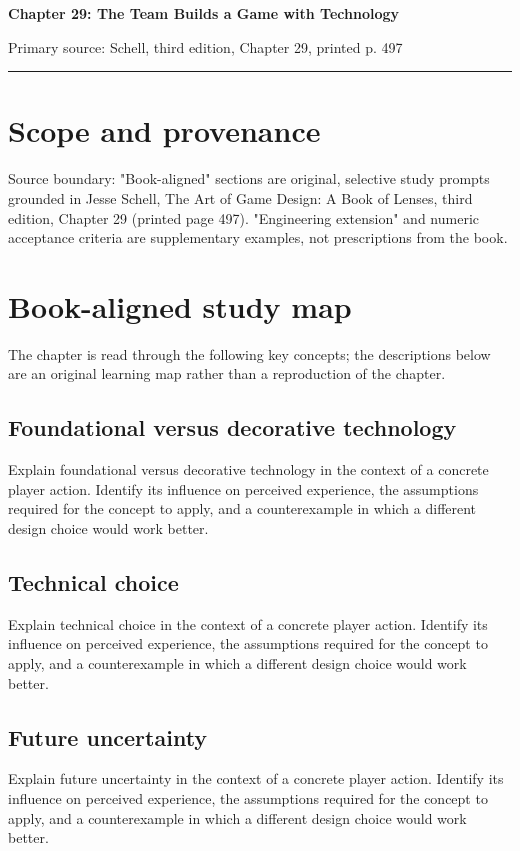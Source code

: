 \documentclass[11pt]{article}
\begin{document}
{\huge\bfseries\color{suiteblue} Chapter 29: The Team Builds a Game with Technology}\par
\vspace{0.15in}
{\normalsize\color{suitegray} Primary source: Schell, third edition, Chapter 29, printed p. 497}\par
\vspace{0.15in}\hrule\vspace{0.15in}

\section{Scope and provenance}
Source boundary: "Book-aligned" sections are original, selective study prompts grounded in Jesse Schell, The Art of Game Design: A Book of Lenses, third edition, Chapter 29 (printed page 497). "Engineering extension" and numeric acceptance criteria are supplementary examples, not prescriptions from the book.


\section{Book-aligned study map}
The chapter is read through the following key concepts; the descriptions below are an original learning map rather than a reproduction of the chapter.


\subsection{Foundational versus decorative technology}
Explain foundational versus decorative technology in the context of a concrete player action. Identify its influence on perceived experience, the assumptions required for the concept to apply, and a counterexample in which a different design choice would work better.


\subsection{Technical choice}
Explain technical choice in the context of a concrete player action. Identify its influence on perceived experience, the assumptions required for the concept to apply, and a counterexample in which a different design choice would work better.


\subsection{Future uncertainty}
Explain future uncertainty in the context of a concrete player action. Identify its influence on perceived experience, the assumptions required for the concept to apply, and a counterexample in which a different design choice would work better.
\end{document}
